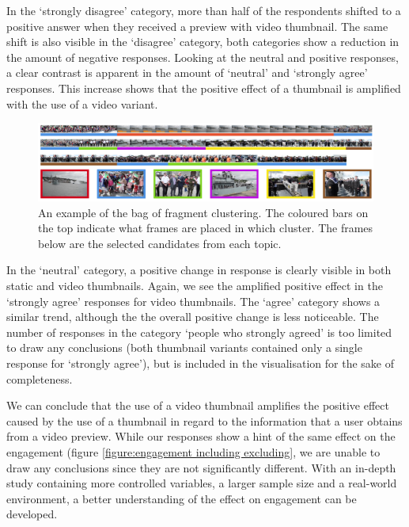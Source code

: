 \documentclass{../resources/sig-alternate-05-2015}
\begin{document}
In the `strongly disagree' category, more than half of the respondents shifted to a positive answer when they received a preview with video thumbnail. The same shift is also visible in the `disagree' category, both categories show a reduction in the amount of negative responses. Looking at the neutral and positive responses, a clear contrast is apparent in the amount of `neutral' and `strongly agree' responses. This increase shows that the positive effect of a thumbnail is amplified with the use of a video variant.

\begin{figure}[tb!]
	\centering
	\includegraphics[width=\textwidth]{resources/clustering.png}
	\caption{An example of the bag of fragment clustering. The coloured bars on the top indicate what frames are placed in which cluster. The frames below are the selected candidates from each topic.}
	\label{figure: topic clustering example}
\end{figure}

In the `neutral' category, a positive change in response is clearly visible in both static and video thumbnails. Again, we see the amplified positive effect in the `strongly agree' responses for video thumbnails. The `agree' category shows a similar trend, although the the overall positive change is less noticeable. The number of responses in the category `people who strongly agreed' is too limited to draw any conclusions (both thumbnail variants contained only a single response for `strongly agree'), but is included in the visualisation for the sake of completeness.

We can conclude that the use of a video thumbnail amplifies the positive effect caused by the use of a thumbnail in regard to the information that a user obtains from a video preview. While our responses show a hint of the same effect on the engagement (figure \ref{figure:engagement including excluding}, we are unable to draw any conclusions since they are not significantly different. With an in-depth study containing more controlled variables, a larger sample size and a real-world environment, a better understanding of the effect on engagement can be developed.
\end{document}
